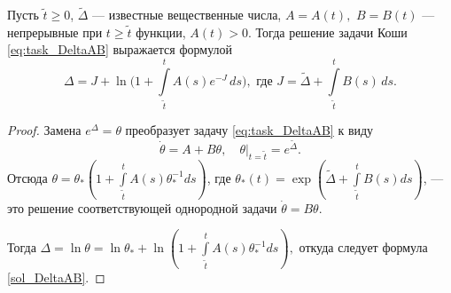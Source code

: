 \begin{lemma}\label{lm:DeltaAB}
Пусть $\tilde{t} \geqslant 0$, $\tilde{\Delta}$ --- известные вещественные числа, $A = A(t),$ $B = B(t)$ --- непрерывные при $t \geq \tilde{t}$ функции, $A(t) > 0$. Тогда решение задачи Коши \eqref{eq:task_DeltaAB} выражается формулой
	\begin{equation}\label{sol_DeltaAB}
	\Delta = J + \ln\Big(1 + \int\limits_{\tilde{t}}^{t} A(s) e^{-J}\,ds \Big),
	\text{ где } J = \tilde{\Delta} + \int\limits_{\tilde{t}}^{t} B(s)\,ds.
	\end{equation}
\end{lemma}
\begin{proof}
    Замена $e^{\Delta}=\theta$ преобразует задачу \eqref{eq:task_DeltaAB} к виду
    \begin{equation}\label{task_theta}
		\dot{\theta}=A+B\theta,\quad\theta|_{t=\tilde{t}}=e^{\tilde{\Delta}}.
    \end{equation}
	Отсюда $\theta=\theta_*(1+\int\limits_{\tilde{t}}^{t}A(s)\theta_*^{-1}ds)$, где $\theta_*(t)=\exp(\tilde{\Delta}+\int\limits_{\tilde{t}}^{t}B(s)ds)$, --- это решение соответствующей однородной задачи $\dot{\theta}=B\theta$.
    
    Тогда $\Delta=\ln\theta=\ln\theta_*+\ln(1+\int\limits_{\tilde{t}}^{t}A(s)\theta_*^{-1}ds),$ откуда следует формула \eqref{sol_DeltaAB}.
\end{proof}

